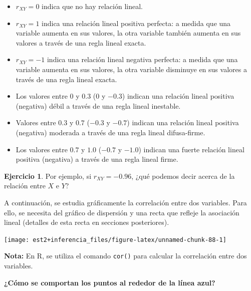 \documentclass[
  11pt,
]{book}
\providecommand{\tightlist}{%
  \setlength{\itemsep}{0pt}\setlength{\parskip}{0pt}}
\theoremstyle{definition}
\theoremstyle{definition}
\theoremstyle{definition}
\newtheorem{exercise}{Ejercicio}[chapter]
\theoremstyle{definition}
\theoremstyle{remark}
\begin{document}
\begin{itemize}
\tightlist
\item
  \(r_{XY} = 0\) indica que no hay relación lineal.
\item
  \(r_{XY} = 1\) indica una relación lineal positiva perfecta: a medida que una variable aumenta en sus valores, la otra variable también aumenta en sus valores a través de una regla lineal exacta.
\item
  \(r_{XY} = -1\) indica una relación lineal negativa perfecta: a medida que una variable aumenta en sus valores, la otra variable disminuye en sus valores a través de una regla lineal exacta.
\item
  Los valores entre \(0\) y \(0.3\) (\(0\) y \(−0.3\)) indican una relación lineal positiva (negativa) débil a través de una regla lineal inestable.
\item
  Valores entre \(0.3\) y \(0.7\) (\(-0.3\) y \(−0.7\)) indican una relación lineal positiva (negativa) moderada a través de una regla lineal difusa-firme.
\item
  Los valores entre \(0.7\) y \(1.0\) (\(−0.7\) y \(−1.0\)) indican una fuerte relación lineal positiva (negativa) a través de una regla lineal firme.
\end{itemize}

\begin{exercise}
Por ejemplo, si \(r_{XY} = -0.96\), ¿qué podemos decir acerca de la relación entre \(X\) e \(Y\)?
\end{exercise}

A continuación, se estudia gráficamente la correlación entre dos variables. Para ello, se necesita del gráfico de dispersión y una recta que refleje la asociación lineal (detalles de esta recta en secciones posteriores).

\begin{center}\texttt{[image: est2+inferencia\_files/figure-latex/unnamed-chunk-88-1]} \end{center}

\textbf{Nota:} En R, se utiliza el comando \texttt{cor()} para calcular la correlación entre dos variables.

\textbf{¿Cómo se comportan los puntos al rededor de la línea azul?}
\end{document}
